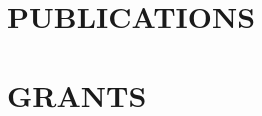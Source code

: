 \documentclass[letterpaper,11pt]{article}
\begin{document}

\section{PUBLICATIONS}



\section{GRANTS}


\end{document}
